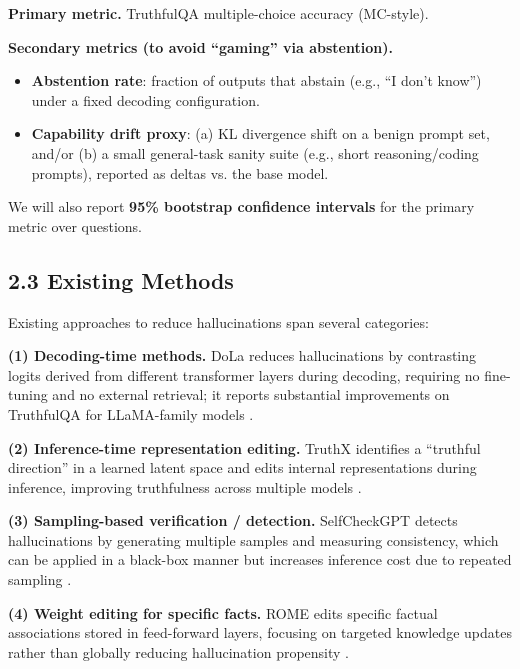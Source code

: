 \textbf{Primary metric.} TruthfulQA multiple-choice accuracy (MC-style).

\textbf{Secondary metrics (to avoid “gaming” via abstention).}
\begin{itemize}
  \item \textbf{Abstention rate}: fraction of outputs that abstain (e.g., “I don’t know”) under a fixed decoding configuration.
  \item \textbf{Capability drift proxy}: (a) KL divergence shift on a benign prompt set, and/or (b) a small general-task sanity suite (e.g., short reasoning/coding prompts), reported as deltas vs. the base model.
\end{itemize}

We will also report \textbf{95\% bootstrap confidence intervals} for the primary metric over questions.


\subsection*{2.3 Existing Methods}

Existing approaches to reduce hallucinations span several categories:

\textbf{(1) Decoding-time methods.} DoLa reduces hallucinations by contrasting logits derived from different transformer layers during decoding, requiring no fine-tuning and no external retrieval; it reports substantial improvements on TruthfulQA for LLaMA-family models \citep{chuang2024dola}.

\textbf{(2) Inference-time representation editing.} TruthX identifies a “truthful direction” in a learned latent space and edits internal representations during inference, improving truthfulness across multiple models \citep{zhang2024truthx}.

\textbf{(3) Sampling-based verification / detection.} SelfCheckGPT detects hallucinations by generating multiple samples and measuring consistency, which can be applied in a black-box manner but increases inference cost due to repeated sampling \citep{manakul2023selfcheckgpt}.

\textbf{(4) Weight editing for specific facts.} ROME edits specific factual associations stored in feed-forward layers, focusing on targeted knowledge updates rather than globally reducing hallucination propensity \citep{meng2022locating}.

